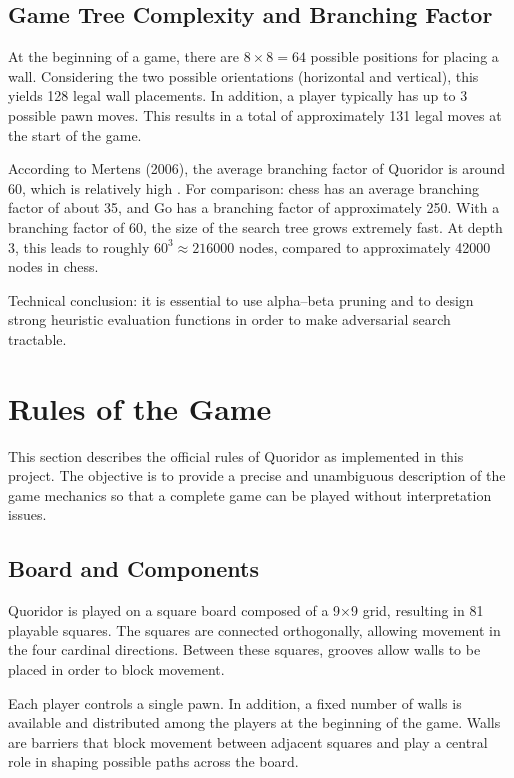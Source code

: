 \documentclass[a4paper]{article}
\begin{document}
\subsection{Game Tree Complexity and Branching Factor}

At the beginning of a game, there are $8 \times 8 = 64$ possible positions for
placing a wall. Considering the two possible orientations (horizontal and
vertical), this yields 128 legal wall placements. In addition, a player
typically has up to 3 possible pawn moves. This results in a total of
approximately 131 legal moves at the start of the game.

According to Mertens (2006), the average branching factor of Quoridor is
around 60, which is relatively high \cite{Mertens2006}. For comparison: chess
has an average branching factor of about 35, and Go has a branching factor of
approximately 250. With a branching factor of 60, the size of the search tree
grows extremely fast. At depth 3, this leads to roughly
$60^3 \approx 216000$ nodes, compared to approximately 42000 nodes in chess.

Technical conclusion: it is essential to use alpha--beta pruning and to design
strong heuristic evaluation functions in order to make adversarial search
tractable.


\section{Rules of the Game}

This section describes the official rules of Quoridor as implemented in this
project. The objective is to provide a precise and unambiguous description of
the game mechanics so that a complete game can be played without
interpretation issues.

\subsection{Board and Components}

Quoridor is played on a square board composed of a 9×9 grid, resulting in 81
playable squares. The squares are connected orthogonally, allowing movement in
the four cardinal directions. Between these squares, grooves allow walls to be
placed in order to block movement.

Each player controls a single pawn. In addition, a fixed number of walls is
available and distributed among the players at the beginning of the game.
Walls are barriers that block movement between adjacent squares and play a
central role in shaping possible paths across the board.
\end{document}
